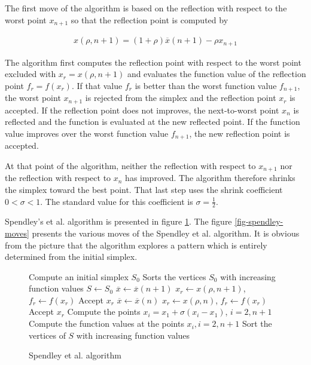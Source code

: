 The first move of the algorithm is based on the reflection
with respect to the worst point $x_{n+1}$ so that the reflection point is 
computed by 

\begin{eqnarray}
\label{interpolate-worst}
x(\rho,n+1) = (1+\rho)\overline{x}(n+1) - \rho x_{n+1}
\end{eqnarray}

The algorithm first computes the reflection point 
with respect to the worst point excluded with $x_r=x(\rho,n+1)$
and evaluates the function value of the reflection
point $f_r=f(x_r)$. If that value $f_r$ is better than the worst function
value $f_{n+1}$, the worst point $x_{n+1}$ is rejected from the 
simplex and the reflection point $x_r$ is accepted. If the reflection point 
does not improves, the next-to-worst point $x_n$ is reflected and the 
function is evaluated at the new reflected point. If the function
value improves over the worst function value $f_{n+1}$, the new reflection point is 
accepted.

At that point of the algorithm, neither the reflection with respect to 
$x_{n+1}$ nor the reflection with respect to $x_n$ has improved.
The algorithm therefore shrinks the simplex toward the best point.
That last step uses the shrink coefficient $0<\sigma<1$. The standard
value for this coefficient is $\sigma=\frac{1}{2}$.

Spendley's et al. algorithm is presented in figure \ref{algo-spendley}.
The figure \ref{fig-spendley-moves} presents the various 
moves of the Spendley et al. algorithm. It is obvious from the 
picture that the algorithm explores a pattern which is 
entirely determined from the initial simplex.

\begin{figure}[htbp]
\begin{algorithmic}
\STATE Compute an initial simplex $S_0$
\STATE Sorts the vertices $S_0$ with increasing function values
\STATE $S\gets S_0$
  \STATE $\overline{x}\gets \overline{x}(n+1)$
  \STATE $x_r \gets x(\rho,n+1)$, $f_r \gets f(x_r)$ 
    \STATE Accept $x_r$
  \ELSE
    \STATE $\overline{x}\gets \overline{x}(n)$
    \STATE $x_r \gets x(\rho,n)$, $f_r \gets f(x_r)$ 
      \STATE Accept $x_r$
    \ELSE 
      \STATE Compute the points $x_i=x_1 + \sigma (x_i - x_1)$, $i=2,n+1$ 
      \STATE Compute the function values at the points $x_i, i=2,n+1$
    \ENDIF
  \ENDIF
  \STATE Sort the vertices of $S$ with increasing function values
\ENDWHILE
\end{algorithmic}
\caption{Spendley et al. algorithm}
\label{algo-spendley}
\end{figure}


